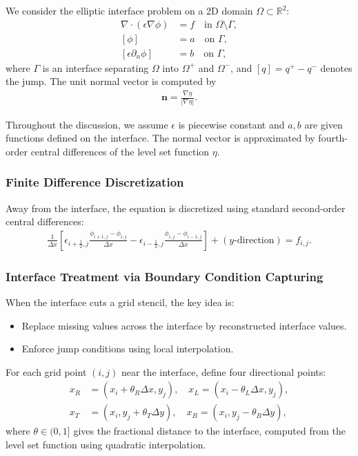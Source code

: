 We consider the elliptic interface problem on a 2D domain $\Omega \subset \mathbb{R}^2$:
\begin{align}
	\nabla \cdot (\epsilon \nabla \phi) & = f \quad \text{in } \Omega \setminus \Gamma, \\
	[\phi]                              & = a \quad \text{on } \Gamma,                  \\
	[\epsilon \partial_n \phi]          & = b \quad \text{on } \Gamma,
\end{align}
where $\Gamma$ is an interface separating $\Omega$ into $\Omega^+$ and $\Omega^-$, and $[q] = q^+ - q^-$ denotes the jump. The unit normal vector is computed by
\begin{align}
	\mathbf{n} = \frac{\nabla \eta}{|\nabla \eta|}.
\end{align}

Throughout the discussion, we assume $\epsilon$ is piecewise constant and $a,b$ are given functions defined on the interface. The normal vector is approximated by fourth-order central differences of the level set function $\eta$.

\subsubsection{Finite Difference Discretization}

Away from the interface, the equation is discretized using standard second-order central differences:
\begin{align}
	\frac{1}{\Delta x}
	\left[
		\epsilon_{i+\frac{1}{2},j} \frac{\phi_{i+1,j} - \phi_{i,j}}{\Delta x}
		-
		\epsilon_{i-\frac{1}{2},j} \frac{\phi_{i,j} - \phi_{i-1,j}}{\Delta x}
		\right]
	+ (\text{$y$-direction}) = f_{i,j}.
\end{align}

\subsubsection{Interface Treatment via Boundary Condition Capturing}

When the interface cuts a grid stencil, the key idea is:
\begin{itemize}
	\item Replace missing values across the interface by reconstructed interface values.
	\item Enforce jump conditions using local interpolation.
\end{itemize}

For each grid point $(i,j)$ near the interface, define four directional points:
\begin{align}
	x_R & = (x_i + \theta_R \Delta x, y_j), \quad
	x_L = (x_i - \theta_L \Delta x, y_j),         \\
	x_T & = (x_i, y_j + \theta_T \Delta y), \quad
	x_B = (x_i, y_j - \theta_B \Delta y),
\end{align}
where $\theta \in (0,1]$ gives the fractional distance to the interface, computed from the level set function using quadratic interpolation.

